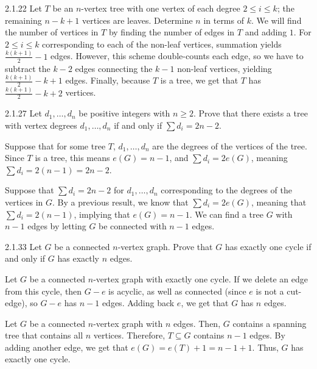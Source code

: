 \documentclass[10pt]{extarticle}
\title{}
\author{Avinash Iyer}
\date{}
\begin{document}
{
\begin{problem}{2.1.22}
  Let $T$ be an $n$-vertex tree with one vertex of each degree $2\leq i \leq k$; the remaining $n-k+1$ vertices are leaves. Determine $n$ in terms of $k$.
  \tcblower
  We will find the number of vertices in $T$ by finding the number of edges in $T$ and adding $1$. For $2\leq i\leq k$ corresponding to each of the non-leaf vertices, summation yields $\frac{k(k+1)}{2}-1$ edges. However, this scheme double-counts each edge, so we have to subtract the $k-2$ edges connecting the $k-1$ non-leaf vertices, yielding $\frac{k(k+1)}{2}-k+1$ edges. Finally, because $T$ is a tree, we get that $T$ has $\frac{k(k+1)}{2}-k+2$ vertices.
\end{problem}
\begin{problem}{2.1.27}
  Let $d_1,\dots,d_n$ be positive integers with $n\geq 2$. Prove that there exists a tree with vertex degrees $d_1,\dots,d_n$ if and only if $\sum d_i = 2n-2$.
  \tcblower
  \begin{description}[font=\normalfont\scshape]
    \item[($\Rightarrow$)] Suppose that for some tree $T$, $d_1,\dots,d_n$ are the degrees of the vertices of the tree. Since $T$ is a tree, this means $e(G) = n-1$, and $\sum d_i = 2e(G)$, meaning $\sum d_i = 2(n-1) = 2n-2$.
    \item[($\Leftarrow$)] Suppose that $\sum d_i = 2n-2$ for $d_1,\dots,d_n$ corresponding to the degrees of the vertices in $G$. By a previous result, we know that $\sum d_i = 2e(G)$, meaning that $\sum d_i = 2(n-1)$, implying that $e(G) = n-1$. We can find a tree $G$ with $n-1$ edges by letting $G$ be connected with $n-1$ edges.
  \end{description}
\end{problem}
\begin{problem}{2.1.33}
  Let $G$ be a connected $n$-vertex graph. Prove that $G$ has exactly one cycle if and only if $G$ has exactly $n$ edges.
  \tcblower
  \begin{description}[font=\normalfont\scshape]
    \item[($\Rightarrow$)] Let $G$ be a connected $n$-vertex graph with exactly one cycle. If we delete an edge from this cycle, then $G-e$ is acyclic, as well as connected (since $e$ is not a cut-edge), so $G-e$ has $n-1$ edges. Adding back $e$, we get that $G$ has $n$ edges.
    \item[($\Leftarrow$)] Let $G$ be a connected $n$-vertex graph with $n$ edges. Then, $G$ contains a spanning tree that contains all $n$ vertices. Therefore, $T\subseteq G$ contains $n-1$ edges. By adding another edge, we get that $e(G) = e(T) + 1 = n-1+1$. Thus, $G$ has exactly one cycle.

\end{description}
\end{problem}}
\end{document}
